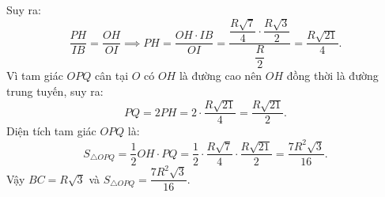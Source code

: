 \begin{bt}
{\begin{enumerate}[a)]
	Suy ra:
	$$\dfrac{PH}{IB} = \dfrac{OH}{OI} \implies PH = \dfrac{OH \cdot IB}{OI} = \dfrac{\dfrac{R\sqrt{7}}{4} \cdot \dfrac{R\sqrt{3}}{2}}{\dfrac{R}{2}} = \dfrac{R\sqrt{21}}{4}.$$
	Vì tam giác $OPQ$ cân tại $O$ có $OH$ là đường cao nên $OH$ đồng thời là đường trung tuyến, suy ra:
	$$PQ = 2PH = 2 \cdot \dfrac{R\sqrt{21}}{4} = \dfrac{R\sqrt{21}}{2}.$$
	Diện tích tam giác $OPQ$ là:
	$$S_{\triangle OPQ} = \dfrac{1}{2} OH \cdot PQ = \dfrac{1}{2} \cdot \dfrac{R\sqrt{7}}{4} \cdot \dfrac{R\sqrt{21}}{2} = \dfrac{7R^2\sqrt{3}}{16}.$$
	Vậy $BC = R\sqrt{3}$ và $S_{\triangle OPQ} = \dfrac{7R^2\sqrt{3}}{16}$.
\end{enumerate}
}
\end{bt}


